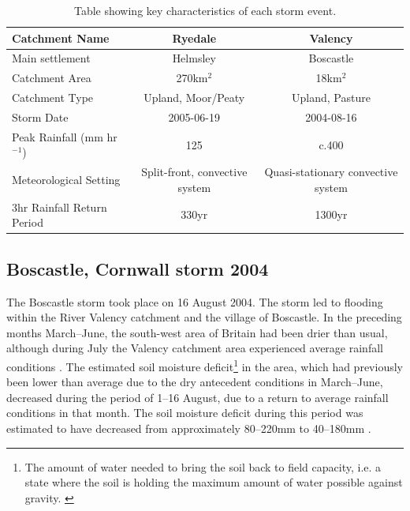 \linespread{1.5}
\begin{table}
\resizebox{\textwidth}{!}
{%
\begin{tabular}{l c c} \hline

Catchment Name 			& \textbf{Ryedale} &  \textbf{Valency} \\ \hline
Main settlement        & Helmsley             & Boscastle \\
Catchment Area   			& 270km$^2$ 				& 18km$^2$ \\ 
Catchment Type         & Upland, Moor/Peaty & Upland, Pasture \\ 
Storm Date	 		            & 2005-06-19 	& 2004-08-16 \\ 
Peak Rainfall	 (mm hr \(^{-1}\))  & 125  & c.400 \\
Meteorological Setting	 	& Split-front, convective system & Quasi-stationary convective system \\ 
3hr Rainfall Return Period 	 & 330yr \citep{wass2008investigation}	& 1300yr \citep{burt2005cloudburst} \\ \hline
\end{tabular}
}
\caption{Table showing key characteristics of each storm event.}
\label{table_met_setting}
\end{table}

\subsection{Boscastle, Cornwall storm 2004}
The Boscastle storm took place on 16 August 2004. The storm led to flooding within the River Valency catchment and the village of Boscastle. In the preceding months March--June, the south-west area of Britain had been drier than usual, although during July the Valency catchment area experienced average rainfall conditions \citep{golding2005boscastle}. The estimated soil moisture deficit\footnote{The amount of water needed to bring the soil back to field capacity, i.e. a state where the soil is holding the maximum amount of water possible against gravity. \citep{beven2011rainfall}} in the area, which had previously been lower than average due to the dry antecedent conditions in March--June, decreased during the period of 1--16 August, due to a return to average rainfall conditions in that month. The soil moisture deficit during this period was estimated to have decreased from approximately 80--220mm to 40--180mm \citep{golding2005boscastle}.

